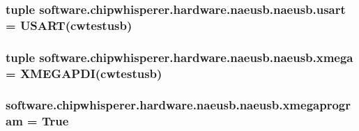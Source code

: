 \subsubsection[{usart}]{\setlength{\rightskip}{0pt plus 5cm}tuple software.\+chipwhisperer.\+hardware.\+naeusb.\+naeusb.\+usart = U\+S\+A\+R\+T({\bf cwtestusb})}\label{namespacesoftware_1_1chipwhisperer_1_1hardware_1_1naeusb_1_1naeusb_a718d6db4be65b5c05643f40c26113f20}
\hypertarget{namespacesoftware_1_1chipwhisperer_1_1hardware_1_1naeusb_1_1naeusb_a1f0d4205534ef2e7f7461e7aa9b6e737}{}
\subsubsection[{xmega}]{\setlength{\rightskip}{0pt plus 5cm}tuple software.\+chipwhisperer.\+hardware.\+naeusb.\+naeusb.\+xmega = X\+M\+E\+G\+A\+P\+D\+I({\bf cwtestusb})}\label{namespacesoftware_1_1chipwhisperer_1_1hardware_1_1naeusb_1_1naeusb_a1f0d4205534ef2e7f7461e7aa9b6e737}
\hypertarget{namespacesoftware_1_1chipwhisperer_1_1hardware_1_1naeusb_1_1naeusb_acc30c1f6f61ce888741a3f8c58a61344}{}
\subsubsection[{xmegaprogram}]{\setlength{\rightskip}{0pt plus 5cm}software.\+chipwhisperer.\+hardware.\+naeusb.\+naeusb.\+xmegaprogram = True}\label{namespacesoftware_1_1chipwhisperer_1_1hardware_1_1naeusb_1_1naeusb_acc30c1f6f61ce888741a3f8c58a61344}

